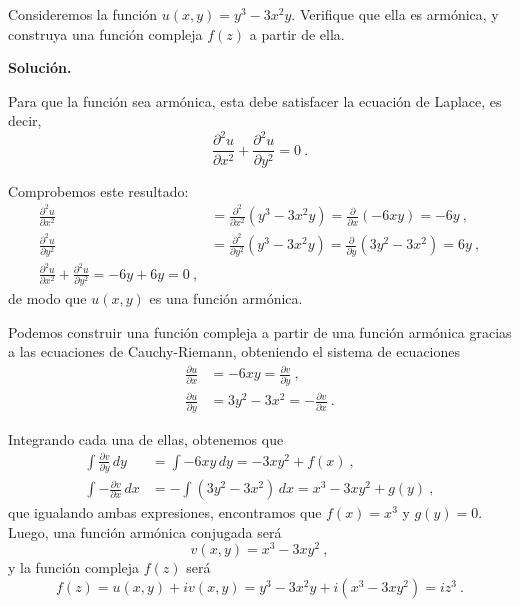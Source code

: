 \begin{ejemplo}
    Consideremos la función $u(x,y) = y^3 - 3x^2y$. Verifique que ella es armónica, y construya una función compleja $f(z)$ a partir de ella.

    \noindent \textbf{Solución.}

    \noindent Para que la función sea armónica, esta debe satisfacer la ecuación de Laplace, es decir,
    \begin{equation*}
        \frac{\partial^2 u}{\partial x^2} + \frac{\partial^2 u}{\partial y^2} = 0 \ .
    \end{equation*}

    Comprobemos este resultado:
    \begin{align*}
        \frac{\partial^2 u}{\partial x^2} & = \frac{\partial^2}{\partial x^2}(y^3-3x^2y) = \frac{\partial}{\partial x}(-6xy) = -6y \ , \\
        \frac{\partial^2 u}{\partial y^2} & = \frac{\partial^2}{\partial y^2}(y^3-3x^2y) = \frac{\partial}{\partial y}(3y^2 - 3x^2) = 6y \ , \\
        \frac{\partial^2 u}{\partial x^2} + \frac{\partial^2 u}{\partial y^2} = -6y + 6y = 0 \ ,
    \end{align*}
    de modo que $u(x,y)$ es una función armónica.

    Podemos construir una función compleja a partir de una función armónica gracias a las ecuaciones de Cauchy-Riemann, obteniendo el sistema de ecuaciones 
    \begin{align*}
        \frac{\partial u}{\partial x} & = -6xy = \frac{\partial v}{\partial y} \ , \\
        \frac{\partial u}{\partial y} & = 3y^2 - 3x^2 = - \frac{\partial v}{\partial x} \ .
    \end{align*}

    Integrando cada una de ellas, obtenemos que 
    \begin{align*}
        \int \frac{\partial v}{\partial y} \, dy & = \int -6xy \, dy = -3xy^2 + f(x) \ , \\
        \int - \frac{\partial v}{\partial x} \, dx & = -\int (3y^2 - 3x^2) \, dx = x^3 - 3xy^2 + g(y) \ ,
    \end{align*}
    que igualando ambas expresiones, encontramos que $f(x) = x^3$ y $g(y) = 0$. Luego, una función armónica conjugada será 
    \begin{equation*}
        v(x,y) = x^3 - 3xy^2 \ ,
    \end{equation*}
    y la función compleja $f(z)$ será 
     \begin{equation*}
        f(z) = u(x,y) + iv(x,y) = y^3 - 3x^2y + i(x^3 - 3xy^2) = iz^3 \ .
     \end{equation*}
\end{ejemplo}

